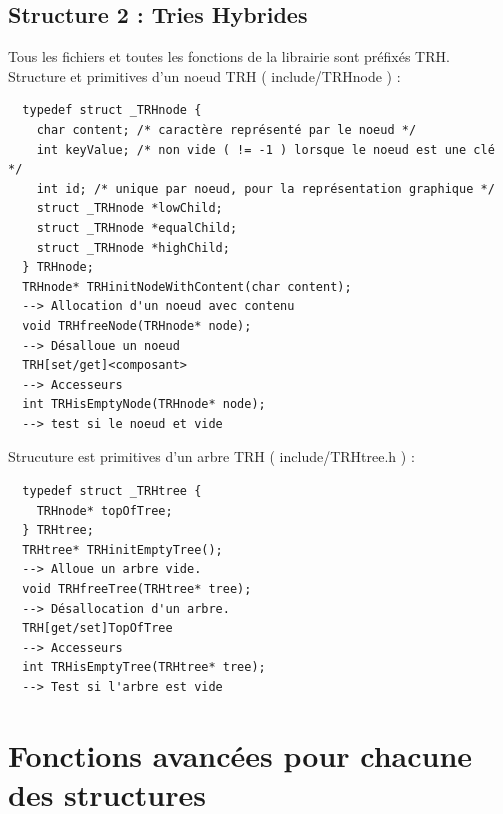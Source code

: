 \documentclass[a4paper,8pt]{report}
\begin{document}
\section*{Structure 2 : Tries Hybrides}\label{sec:name}
Tous les fichiers et toutes les fonctions de la librairie sont préfixés TRH.\\
Structure et primitives d'un noeud TRH ( include/TRHnode ) :
\begin{verbatim}
  typedef struct _TRHnode {
    char content; /* caractère représenté par le noeud */
    int keyValue; /* non vide ( != -1 ) lorsque le noeud est une clé */
    int id; /* unique par noeud, pour la représentation graphique */
    struct _TRHnode *lowChild;
    struct _TRHnode *equalChild;
    struct _TRHnode *highChild;
  } TRHnode;
  TRHnode* TRHinitNodeWithContent(char content);
  --> Allocation d'un noeud avec contenu
  void TRHfreeNode(TRHnode* node);
  --> Désalloue un noeud
  TRH[set/get]<composant>
  --> Accesseurs
  int TRHisEmptyNode(TRHnode* node);
  --> test si le noeud et vide
\end{verbatim}
Strucuture est primitives d'un arbre TRH ( include/TRHtree.h ) :
\begin{verbatim}
  typedef struct _TRHtree {
    TRHnode* topOfTree;
  } TRHtree;
  TRHtree* TRHinitEmptyTree();
  --> Alloue un arbre vide.
  void TRHfreeTree(TRHtree* tree);
  --> Désallocation d'un arbre.
  TRH[get/set]TopOfTree
  --> Accesseurs
  int TRHisEmptyTree(TRHtree* tree);
  --> Test si l'arbre est vide
\end{verbatim}

\chapter{Fonctions avancées pour chacune des structures}
\end{document}
